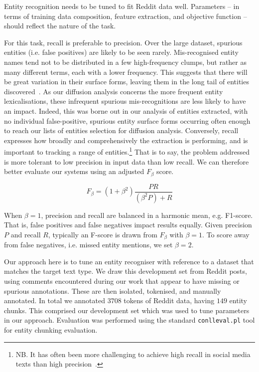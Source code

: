 \documentclass[acmsmall]{acmart}
\begin{document}
Entity recognition needs to be tuned to fit Reddit data well.
Parameters -- in terms of training data composition, feature extraction, and objective function -- should reflect the nature of the task.

For this task, recall is preferable to precision.
Over the large dataset, spurious entities (i.e. false positives) are likely to be seen rarely.
Mis-recognised entity names tend not to be distributed in a few high-frequency clumps, but rather as many different terms, each with a lower frequency.
This suggests that there will be great variation in their surface forms, leaving them in the long tail of entities discovered~\cite{leginus2015enhanced}.
As our diffusion analysis concerns the more frequent entity lexicalisations, these infrequent spurious mis-recognitions are less likely to have an impact.
Indeed, this was borne out in our analysis of entities extracted, with no individual  false-positive, spurious entity surface forms occurring often enough to reach our lists of entities selection for diffusion analysis.
Conversely, recall expresses how broadly and comprehensively the extraction is performing, and is important to tracking a range of entities.\footnote{NB. It has often been more challenging to achieve high recall in social media texts than high precision~\cite{ritter2011named,derczynski2015analysis}.}
That is to say, the problem addressed is more tolerant to low precision in input data than low recall.
We can therefore better evaluate our systems using an adjusted $F_\beta$ score.

\begin{equation}
F_\beta = (1+\beta^2)\frac{PR}{(\beta^2 P) + R} 
\end{equation}

When $\beta=1$, precision and recall are balanced in a harmonic mean, e.g. F1-score.
That is, false positives and false negatives impact results equally.
Given precision $P$ and recall $R$, typically an F-score is drawn from $F_\beta$ with $\beta=1$.
To score away from false negatives, i.e. missed entity mentions, we set $\beta=2$.

Our approach here is to tune an entity recogniser with reference to a dataset that matches the target text type.
We draw this development set from Reddit posts, using comments encountered during our work that appear to have missing or spurious annotations.
These are then isolated, tokenised, and manually annotated.
In total we annotated $3 708$ tokens of Reddit data, having $149$ entity chunks.
This comprised our development set which was used to tune parameters in our approach.
Evaluation was performed using the standard {\tt \small conlleval.pl} tool for entity chunking evaluation.
\end{document}
